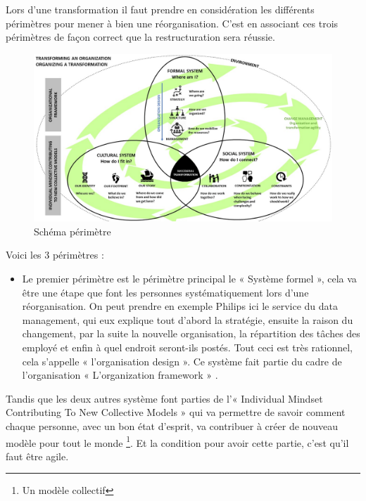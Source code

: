 \documentclass[12pt,a4paper]{article}
\begin{document}
\newpage

Lors d'une transformation il faut prendre en considération les différents périmètres pour mener à bien une réorganisation. C'est en associant ces trois périmètres de façon correct que la restructuration sera réussie.\\

\begin{figure}[h!]
\centering
\includegraphics[scale=0.45]{"Diapositive2"}
\caption{Schéma périmètre}
\label{fig:scope}
\end{figure}


Voici les 3 périmètres : \\ 

\begin{itemize}

\item Le premier périmètre est le périmètre principal le « Système formel », cela va être une étape que font les personnes systématiquement lors d'une réorganisation. On peut prendre en exemple Philips ici le service du data management, qui eux explique tout d'abord la stratégie, ensuite la raison du changement, par la suite la nouvelle organisation, la répartition des tâches des employé et enfin à quel endroit seront-ils postés. Tout ceci est très rationnel, cela s'appelle « l'organisation design ». Ce système fait partie du cadre de l'organisation « L'organization framework » .\\
\end{itemize}
Tandis que les deux autres système font parties de l'« Individual Mindset Contributing To New Collective Models » qui va permettre de savoir comment chaque personne, avec un bon état d'esprit, va contribuer à créer de nouveau modèle pour tout le monde \footnote{Un modèle collectif}. Et la condition pour avoir cette partie, c'est qu'il faut être agile.\\
\end{document}
